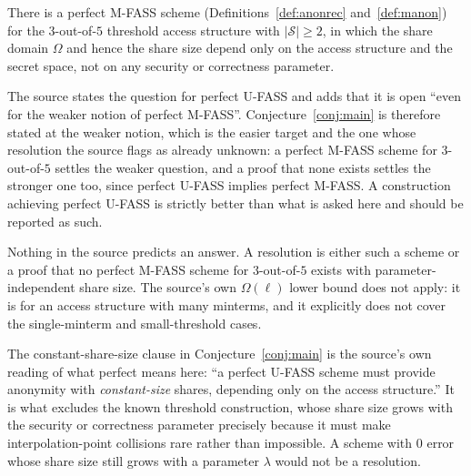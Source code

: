 \documentclass{aicr-conjecture}
\newcommand{\Sh}{\mathcal{S}}
\newcommand{\Om}{\Omega}
\begin{document}
\begin{conjecture}\label{conj:main}
There is a perfect M-FASS scheme (Definitions~\ref{def:anonrec}
and~\ref{def:manon}) for the $3$-out-of-$5$ threshold access structure
with $|\Sh| \ge 2$, in which the share domain $\Omega$ and hence the
share size depend only on the access structure and the secret space, not
on any security or correctness parameter.
\end{conjecture}

\begin{remark}
The source states the question for perfect U-FASS and adds that it is
open ``even for the weaker notion of perfect M-FASS''.
Conjecture~\ref{conj:main} is therefore stated at the weaker notion,
which is the easier target and the one whose resolution the source flags
as already unknown: a perfect M-FASS scheme for $3$-out-of-$5$ settles
the weaker question, and a proof that none exists settles the stronger
one too, since perfect U-FASS implies perfect M-FASS\@. A construction
achieving perfect U-FASS is strictly better than what is asked here and
should be reported as such.
\end{remark}

\begin{remark}
Nothing in the source predicts an answer. A resolution is either such a
scheme or a proof that no perfect M-FASS scheme for $3$-out-of-$5$ exists
with parameter-independent share size. The source's own $\Om(\ell)$ lower
bound does not apply: it is for an access structure with many minterms,
and it explicitly does not cover the single-minterm and small-threshold
cases.
\end{remark}

\begin{remark}
The constant-share-size clause in Conjecture~\ref{conj:main} is the
source's own reading of what perfect means here: ``a perfect U-FASS
scheme must provide anonymity with \emph{constant-size} shares, depending
only on the access structure.'' It is what excludes the known
threshold construction, whose share size grows with the security or
correctness parameter precisely because it must make interpolation-point
collisions rare rather than impossible. A scheme with $0$ error whose
share size still grows with a parameter $\lambda$ would not be a
resolution.
\end{remark}
\end{document}
